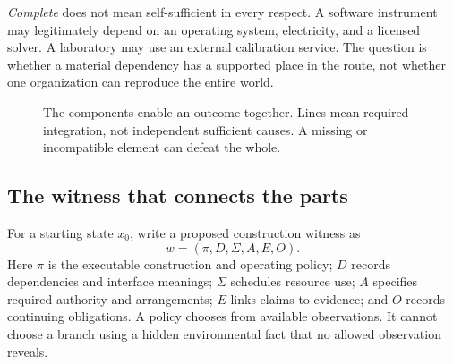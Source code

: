 \emph{Complete} does not mean self-sufficient in every respect. A software instrument may legitimately depend on an operating system, electricity, and a licensed solver. A laboratory may use an external calibration service. The question is whether a material dependency has a supported place in the route, not whether one organization can reproduce the entire world.

\begin{figure}[htbp]
\centering
{}
\caption{The components enable an outcome together. Lines mean required integration, not independent sufficient causes. A missing or incompatible element can defeat the whole.}
\end{figure}

\subsection{The witness that connects the parts}

For a starting state $x_0$, write a proposed construction witness as
\begin{equation}
w=(\pi,D,\Sigma,A,E,O).
\label{eq:witness}
\end{equation}
Here $\pi$ is the executable construction and operating policy; $D$ records dependencies and interface meanings; $\Sigma$ schedules resource use; $A$ specifies required authority and arrangements; $E$ links claims to evidence; and $O$ records continuing obligations. A policy chooses from available observations. It cannot choose a branch using a hidden environmental fact that no allowed observation reveals.

